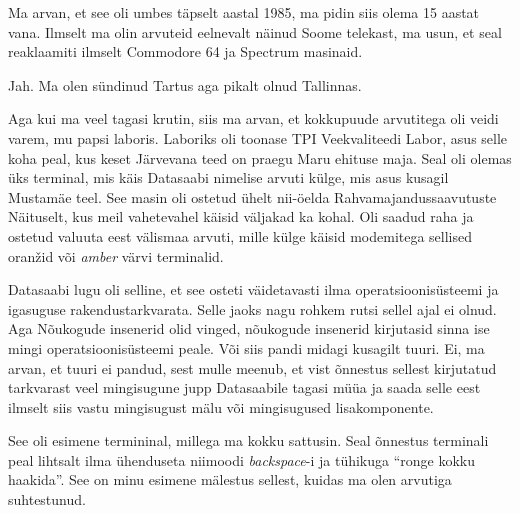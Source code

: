 

Ma arvan, et see oli umbes täpselt aastal 1985, ma pidin siis olema 15 aastat vana. Ilmselt ma olin arvuteid eelnevalt näinud Soome telekast, ma usun, et seal reaklaamiti ilmselt Commodore 64 ja Spectrum masinaid. 


Jah. Ma olen sündinud Tartus aga pikalt olnud Tallinnas. 

Aga kui ma veel tagasi krutin, siis ma arvan, et kokkupuude arvutitega oli veidi varem, mu papsi laboris. Laboriks oli toonase TPI Veekvaliteedi Labor, asus selle koha peal, kus keset Järvevana teed on praegu Maru ehituse maja. Seal oli olemas üks terminal, mis käis Datasaabi nimelise arvuti külge, mis asus kusagil Mustamäe teel. See masin oli ostetud ühelt nii-öelda Rahvamajandussaavutuste Näituselt, kus meil vahetevahel käisid väljakad ka kohal. Oli saadud raha ja ostetud valuuta eest välismaa arvuti, mille külge käisid modemitega sellised oranžid või \emph{amber} värvi terminalid. 

Datasaabi lugu oli selline, et see osteti väidetavasti ilma operatsioonisüsteemi ja igasuguse rakendustarkvarata. Selle jaoks nagu rohkem rutsi sellel ajal ei olnud. Aga Nõukogude insenerid olid vinged, nõukogude insenerid kirjutasid sinna ise mingi operatsioonisüsteemi peale. Või siis pandi midagi kusagilt tuuri. Ei, ma arvan, et tuuri ei pandud, sest mulle meenub, et vist õnnestus sellest kirjutatud tarkvarast veel mingisugune jupp Datasaabile tagasi müüa ja saada selle eest ilmselt siis vastu mingisugust mälu või mingisugused lisakomponente. 

See oli esimene termininal, millega ma kokku sattusin. Seal õnnestus terminali peal lihtsalt ilma ühenduseta niimoodi \emph{backspace}-i ja  tühikuga \enquote{ronge kokku haakida}. See on minu esimene mälestus sellest, kuidas ma olen arvutiga suhtestunud. 

